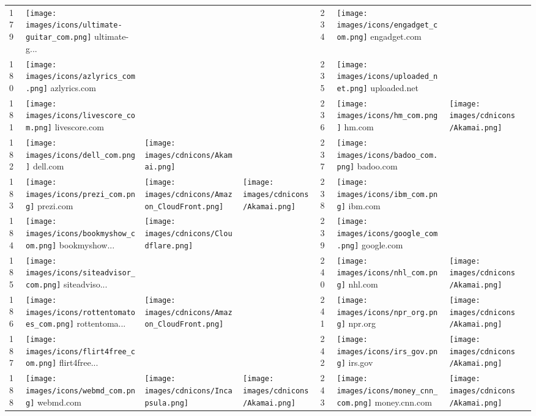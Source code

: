 \begin{table}[tbp]
\begin{tabular}{|llll|llll|}
179 & \texttt{[image: images/icons/ultimate-guitar\_com.png]} ultimate-g... & & & 234 & \texttt{[image: images/icons/engadget\_com.png]} engadget.com & & \\
180 & \texttt{[image: images/icons/azlyrics\_com.png]} azlyrics.com & & & 235 & \texttt{[image: images/icons/uploaded\_net.png]} uploaded.net & & \\
181 & \texttt{[image: images/icons/livescore\_com.png]} livescore.com & & & 236 & \texttt{[image: images/icons/hm\_com.png]} hm.com & \texttt{[image: images/cdnicons/Akamai.png]} & \\
182 & \texttt{[image: images/icons/dell\_com.png]} dell.com & \texttt{[image: images/cdnicons/Akamai.png]} & & 237 & \texttt{[image: images/icons/badoo\_com.png]} badoo.com & & \\
183 & \texttt{[image: images/icons/prezi\_com.png]} prezi.com & \texttt{[image: images/cdnicons/Amazon\_CloudFront.png]} & \texttt{[image: images/cdnicons/Akamai.png]} & 238 & \texttt{[image: images/icons/ibm\_com.png]} ibm.com & & \\
184 & \texttt{[image: images/icons/bookmyshow\_com.png]} bookmyshow... & \texttt{[image: images/cdnicons/Cloudflare.png]} & & 239 & \texttt{[image: images/icons/google\_com.png]} google.com & & \\
185 & \texttt{[image: images/icons/siteadvisor\_com.png]} siteadviso... & & & 240 & \texttt{[image: images/icons/nhl\_com.png]} nhl.com & \texttt{[image: images/cdnicons/Akamai.png]} & \\
186 & \texttt{[image: images/icons/rottentomatoes\_com.png]} rottentoma... & \texttt{[image: images/cdnicons/Amazon\_CloudFront.png]} & & 241 & \texttt{[image: images/icons/npr\_org.png]} npr.org & \texttt{[image: images/cdnicons/Akamai.png]} & \\
187 & \texttt{[image: images/icons/flirt4free\_com.png]} flirt4free... & & & 242 & \texttt{[image: images/icons/irs\_gov.png]} irs.gov & \texttt{[image: images/cdnicons/Akamai.png]} & \\
188 & \texttt{[image: images/icons/webmd\_com.png]} webmd.com & \texttt{[image: images/cdnicons/Incapsula.png]} & \texttt{[image: images/cdnicons/Akamai.png]} & 243 & \texttt{[image: images/icons/money\_cnn\_com.png]} money.cnn.com & \texttt{[image: images/cdnicons/Akamai.png]} & \\

\end{tabular}
\end{table}
